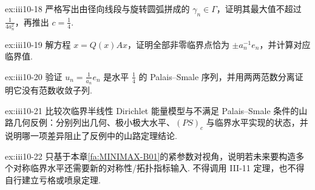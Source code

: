 \begin{FAExercise}[反例中的上界路径]{ex:iii10-18}
严格写出由径向线段与旋转圆弧拼成的 \(\displaystyle\gamma_n\in\Gamma\)，证明其最大值不超过 \(\displaystyle\frac{1}{4a_n^2}\)，再推出 \(\displaystyle c=\frac{1}{4}\).
\end{FAExercise}

\begin{FAExercise}[反例中的临界点集]{ex:iii10-19}
解方程 \(\displaystyle x=Q(x)Ax\)，证明全部非零临界点恰为 \(\displaystyle\pm a_n^{-1}e_n\)，并计算对应临界值.
\end{FAExercise}

\begin{FAExercise}{ex:iii10-20}
验证 \(\displaystyle u_n=\frac{1}{a_n}e_n\) 是水平 \(\displaystyle\frac{1}{4}\) 的 Palais--Smale 序列，并用两两范数分离证明它没有范数收敛子列.
\end{FAExercise}

\begin{FAExercise}[几何与紧性的比较]{ex:iii10-21}
比较次临界半线性 Dirichlet 能量模型与不满足 Palais--Smale 条件的山路几何反例：分别列出几何、极小极大水平、\(\displaystyle(PS)_c\) 与临界水平实现的状态，并说明哪一项差异阻止了反例中的山路定理结论.
\end{FAExercise}

\begin{FAExercise}{ex:iii10-22}
只基于本章\autoref{fa:MINIMAX-B01}的紧参数对视角，说明若未来要构造多个对称临界水平还需要新的对称性/拓扑指标输入. 不得调用 III-11 定理，也不得自行建立亏格或喷泉定理.
\end{FAExercise}
